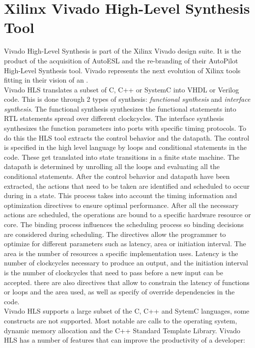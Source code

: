 \section{Xilinx Vivado High-Level Synthesis Tool}
\label{sec:vivado_HLS}
Vivado High-Level Synthesis is part of the Xilinx Vivado design suite. It is the product of the acquisition of AutoESL and the re-branding of their AutoPilot High-Level Synthesis tool. Vivado represents the next evolution of Xilinx tools fitting in their vision of an .\\
Vivado HLS translates a subset of C, C++ or SystemC into VHDL or Verilog code. This is done through 2 types of synthesis: \emph{functional synthesis} and \emph{interface synthesis}. The functional synthesis synthesizes the functional statements into RTL statements spread over different clockcycles. The interface synthesis synthesizes the function parameters into ports with specific timing protocols. To do this the HLS tool extracts the control behavior and the datapath. The control is specified in the high level language by loops and conditional statements in the code. These get translated into state transitions in a finite state machine. The datapath is determined by unrolling all the loops and evaluating all the conditional statements. After the control behavior and datapath have been extracted, the actions that need to be taken are identified and scheduled to occur during in a state. This process takes into account the timing information and optimization directives to ensure optimal performance. After all the necessary actions are scheduled, the operations are bound to a specific hardware resource or core. The binding process influences the scheduling process so binding decisions are considered during scheduling. The directives allow the programmer to optimize for different parameters such as latency, area or initiation interval. The area is the number of resources a specific implementation uses. Latency is the number of clockcycles necessary to produce an output, and the initiation interval is the number of clockcycles that need to pass before a new input can be accepted. there are also directives that allow to constrain the latency of functions or loops and the area used, as well as specify of override dependencies in the code.\\
Vivado HLS supports a large subset of the C, C++ and SytemC languages, some constructs are not supported. Most notable are calls to the operating system, dynamic memory allocation and the C++ Standard Template Library. 
Vivado HLS has a number of features that can improve the productivity of a developer:


